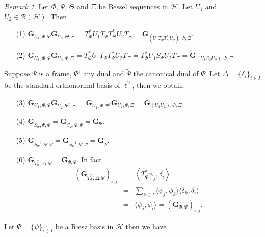 \documentclass{birkjour}
\theoremstyle{definition}
\theoremstyle{remark}
\newtheorem{rem}[thm]{Remark}
\numberwithin{equation}{section}
\newcommand{\BL}[1]{
{\mathcal B} \left( #1 \right)
}
\begin{document}
\begin{rem} Let $\Phi$, $\Psi$, $\Theta$ and $\Xi$ be Bessel sequences in $\mathcal{H}$. Let $U_{1}$  and $U_{2}\in \BL{\mathcal{H}}$. Then
\begin{enumerate}
\item[(1)]
$
   \mathbf{G}_{U_{1},\Phi,\Psi}\mathbf{G}_{U_{2},\Theta,\Xi}=T_{\Phi}^{*}
   U_{1}T_{\Psi}T_{\Theta}^{*}U_{2}T_{\Xi}
 = \mathbf{G}_{\left(U_{1}T_{\Psi}T_{\Theta}^{*}U_{2}\right),\Phi,\Xi}.
   $
\item[(2)]
    $\mathbf{G}_{U_{1},\Phi,\Psi}\mathbf{G}_{U_{2},\Psi,\Xi}=T_{\Phi}^{*}
   U_{1}T_{\Psi}T_{\Psi}^{*} U_{2}T_{\Xi}=T_{\Phi}^{*}
   U_{1}S_{\Psi}U_{2}T_{\Xi}=
    \mathbf{G}_{\left( U_{1}S_{\Psi}U_{2} \right),\Phi,\Xi}$.
\end{enumerate}
Suppose $\Psi$ is a frame, $\Psi^\dagger$ any dual and $\widetilde \Psi$ the canonical dual  of $\Psi$. Let $\Delta=\{\delta_{i}\}_{i\in
I}$  be the standard orthonormal basis of $\ell^{2}$, then we obtain
\cite{xxlframoper1}
\begin{enumerate}
\item[(3)]
    $\mathbf{G}_{U_{1},\Phi,\Psi}\mathbf{G}_{U_{2},\Psi^{\dag},\Xi}=\mathbf{G}_{U_{1}
    ,\Phi,\Psi^{\dag}}\mathbf{G}_{U_{2},\Psi,\Xi}=
    \mathbf{G}_{\left(U_{1} U_{2}\right),\Phi,\Xi}$.
\setcounter{enumi}{3}
\item[(4)] $
    \mathbf{G}_{S_{\Psi},\Psi,\widetilde{\Psi}}=\mathbf{G}_{S_{\Psi},
    \widetilde{\Psi},\Psi}=\mathbf{G}_{\Psi}$.
 \item[(5)]
     $\mathbf{G}_{S_{\Psi}^{-1},\Psi,\widetilde{\Psi}}=
     \mathbf{G}_{S_{\Psi}^{-1},\widetilde{\Psi},\Psi}=
     \mathbf{G}_{\widetilde{\Psi}}$.
      \item[(6)]
          $\mathbf{G}_{T_{\Phi}^{*},\Delta,\Psi}=\mathbf{G}_{\Phi,\Psi}$.
          In fact
\begin{eqnarray*}
      \left(\mathbf{G}_{T_{\Phi}^{*},\Delta,\Psi}\right)_{i,j}&=&
\left\langle T_{\Phi}^{*}\psi_{j},\delta_{i}\right\rangle\\
&=&\sum_{k\in I}\langle \psi_{j},\phi_{k}\rangle\langle \delta_{k},
\delta_{i}\rangle\\
&=&\langle\psi_{j},\phi_{i}\rangle=
      (\mathbf{G}_{\Phi,\Psi})_{i,j}. 
\end{eqnarray*}
\end{enumerate}
Let $\Psi=\{\psi\}_{i\in I}$ be a Riesz basis in $\mathcal{H}$
 then we have 
\begin{enumerate}
\setcounter{enumi}{6} 
\item[(7)]\label{Re8} $

\end{enumerate}
\end{rem}
\end{document}
